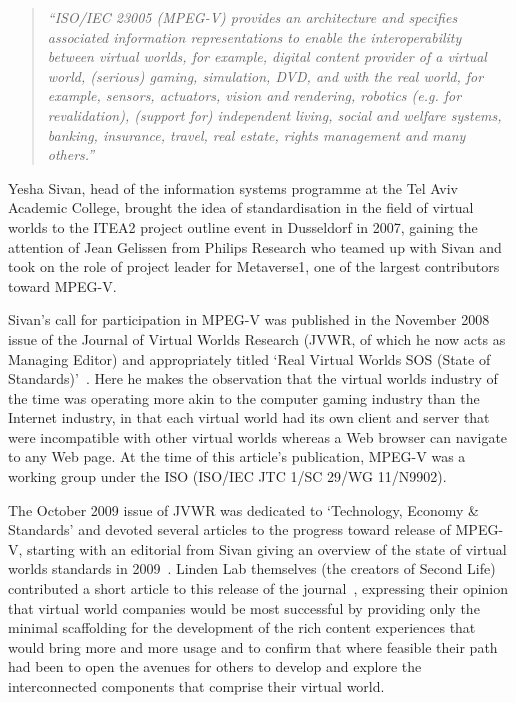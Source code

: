 \begin{quote}
\textit{``ISO/IEC 23005 (MPEG-V) provides an architecture and specifies associated information representations to enable the interoperability between virtual worlds, for example, digital content provider of a virtual world, (serious) gaming, simulation, DVD, and with the real world, for example, sensors, actuators, vision and rendering, robotics (e.g. for revalidation), (support for) independent living, social and welfare systems, banking, insurance, travel, real estate, rights management and many others.''}~\cite{InternationalOrganizationforStandardization2011}
\end{quote}

Yesha Sivan, head of the information systems programme at the Tel Aviv Academic College, brought the idea of standardisation in the field of virtual worlds to the ITEA2 project outline event in Dusseldorf in 2007, gaining the attention of Jean Gelissen from Philips Research who teamed up with Sivan and took on the role of project leader for Metaverse1, one of the largest contributors toward MPEG-V.

Sivan's call for participation in MPEG-V was published in the November 2008 issue of the Journal of Virtual Worlds Research (JVWR, of which he now acts as Managing Editor) and appropriately titled `Real Virtual Worlds SOS (State of Standards)'~\cite{Sivan2008}. Here he makes the observation that the virtual worlds industry of the time was operating more akin to the computer gaming industry than the Internet industry, in that each virtual world had its own client and server that were incompatible with other virtual worlds whereas a Web browser can navigate to any Web page. At the time of this article's publication, MPEG-V was a working group under the ISO (ISO/IEC JTC 1/SC 29/WG 11/N9902).

The October 2009 issue of JVWR was dedicated to `Technology, Economy \& Standards' and devoted several articles to the progress toward release of MPEG-V, starting with an editorial from Sivan giving an overview of the state of virtual worlds standards in 2009~\cite{Sivan2009}. Linden Lab themselves (the creators of Second Life) contributed a short article to this release of the journal~\cite{Rosendale2009}, expressing their opinion that virtual world companies would be most successful by providing only the minimal scaffolding for the development of the rich content experiences that would bring more and more usage and to confirm that where feasible their path had been to open the avenues for others to develop and explore the interconnected components that comprise their virtual world.

